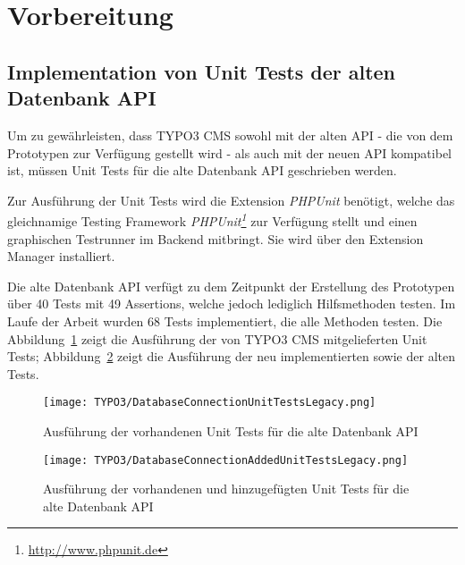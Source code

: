 \section{Vorbereitung}
\label{prototype:sec:preparation}



\subsection{Implementation von Unit Tests der alten Datenbank API}
\label{prototype:sec:createTestForOldAPI}
Um zu gewährleisten, dass TYPO3 CMS sowohl mit der alten API - die von dem Prototypen zur Verfügung gestellt wird - als auch mit der neuen API kompatibel ist, müssen Unit Tests für die alte Datenbank API geschrieben werden.

Zur Ausführung der Unit Tests wird die Extension \textit{PHPUnit} benötigt, welche das gleichnamige Testing Framework \textit{PHPUnit\footnote{\url{http://www.phpunit.de}}} zur Verfügung stellt und einen graphischen Testrunner im Backend mitbringt. Sie wird über den Extension Manager installiert.

Die alte Datenbank API verfügt zu dem Zeitpunkt der Erstellung des Prototypen über 40 Tests mit 49 Assertions, welche jedoch lediglich Hilfsmethoden testen. Im Laufe der Arbeit wurden 68 Tests implementiert, die alle Methoden testen. Die Abbildung~\ref{fig:executeUnitTestsForOldAPI} zeigt die Ausführung der von TYPO3 CMS mitgelieferten Unit Tests; Abbildung~\ref{fig:executeNewUnitTestsForOldAPI} zeigt die Ausführung der neu implementierten sowie der alten Tests.

\begin{figure}[H]
    \centering
    \texttt{[image: TYPO3/DatabaseConnectionUnitTestsLegacy.png]}
    \caption{Ausführung der vorhandenen Unit Tests für die alte Datenbank API}
    \label{fig:executeUnitTestsForOldAPI}
\end{figure}

\begin{figure}[H]
    \centering
    \texttt{[image: TYPO3/DatabaseConnectionAddedUnitTestsLegacy.png]}
    \caption{Ausführung der vorhandenen und hinzugefügten Unit Tests für die alte Datenbank API}
    \label{fig:executeNewUnitTestsForOldAPI}
\end{figure}
